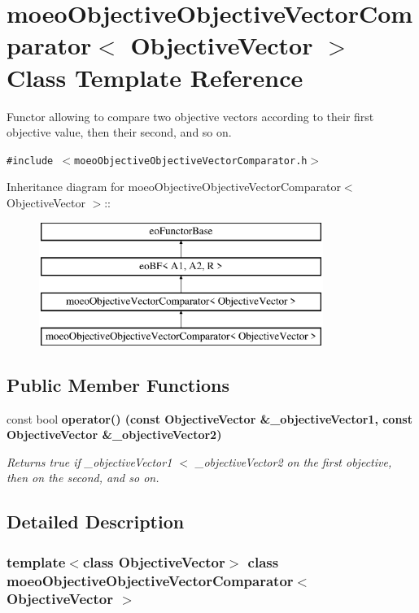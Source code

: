 \section{moeo\-Objective\-Objective\-Vector\-Comparator$<$ Objective\-Vector $>$ Class Template Reference}
\label{classmoeoObjectiveObjectiveVectorComparator}
Functor allowing to compare two objective vectors according to their first objective value, then their second, and so on.  


{\tt \#include $<$moeo\-Objective\-Objective\-Vector\-Comparator.h$>$}

Inheritance diagram for moeo\-Objective\-Objective\-Vector\-Comparator$<$ Objective\-Vector $>$::\begin{figure}[H]
\begin{center}
\leavevmode
\includegraphics[height=4cm]{classmoeoObjectiveObjectiveVectorComparator}
\end{center}
\end{figure}
\subsection*{Public Member Functions}
\begin{CompactItemize}
\item 
const bool \bf{operator()} (const Objective\-Vector \&\_\-objective\-Vector1, const Objective\-Vector \&\_\-objective\-Vector2)
\begin{CompactList}\small\item\em Returns true if \_\-objective\-Vector1 $<$ \_\-objective\-Vector2 on the first objective, then on the second, and so on. \item\end{CompactList}\end{CompactItemize}


\subsection{Detailed Description}
\subsubsection*{template$<$class Objective\-Vector$>$ class moeo\-Objective\-Objective\-Vector\-Comparator$<$ Objective\-Vector $>$}

